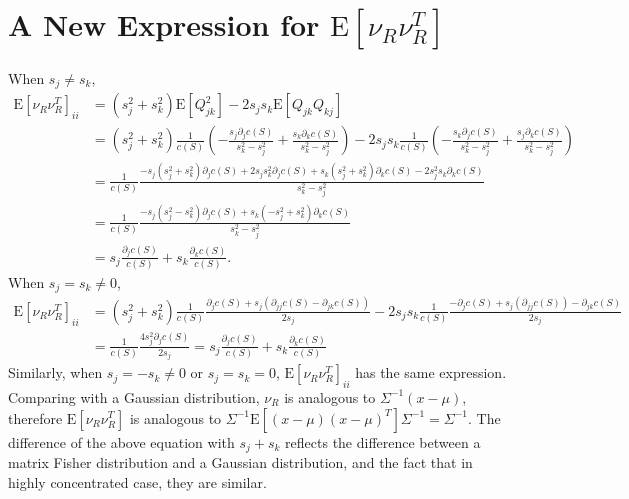 \documentclass[10pt]{article}
\title{\vspace{-4ex}\textbf{}}
\date{}
\newcommand{\expect}[1]{\ensuremath{\mathrm{E}\left[ #1 \right]}}
\begin{document}
\section{A New Expression for $\expect{\nu_R\nu_R^T}$}

When $s_j \neq s_k$,
\begin{align*}
	\expect{\nu_R\nu_R^T}_{ii} &= (s_j^2+s_k^2)\expect{Q_{jk}^2} - 2s_js_k\expect{Q_{jk}Q_{kj}} \\
	&= (s_j^2+s_k^2) \frac{1}{c(S)} \left( -\frac{s_j\partial_jc(S)}{s_k^2-s_j^2} + \frac{s_k\partial_kc(S)}{s_k^2-s_j^2} \right) - 2s_js_k \frac{1}{c(S)} \left( -\frac{s_k\partial_jc(S)}{s_k^2-s_j^2} + \frac{s_j\partial_kc(S)}{s_k^2-s_j^2} \right) \\
	&= \frac{1}{c(S)} \frac{ -s_j(s_j^2+s_k^2)\partial_jc(S) + 2s_js_k^2\partial_jc(S) + s_k(s_j^2+s_k^2)\partial_kc(S) - 2s_j^2s_k\partial_kc(S) }{s_k^2-s_j^2} \\
	&= \frac{1}{c(S)} \frac{ -s_j(s_j^2-s_k^2)\partial_jc(S) + s_k(-s_j^2+s_k^2)\partial_kc(S) }{s_k^2-s_j^2} \\
	&= s_j\frac{\partial_jc(S)}{c(S)} + s_k\frac{\partial_kc(S)}{c(S)}.
\end{align*}
When $s_j=s_k \neq 0$,
\begin{align*}
	\expect{\nu_R\nu_R^T}_{ii} &= (s_j^2+s_k^2) \frac{1}{c(S)} \frac{ \partial_jc(S) + s_j(\partial_{jj}c(S)-\partial_{jk}c(S)) }{2s_j} - 2s_js_k \frac{1}{c(S)} \frac{ -\partial_jc(S) + s_j(\partial_{jj}c(S)) - \partial_{jk}c(S) }{2s_j} \\
	&= \frac{1}{c(S)} \frac{4s_j^2\partial_jc(S)}{2s_j} = s_j\frac{\partial_jc(S)}{c(S)} + s_k\frac{\partial_kc(S)}{c(S)}
\end{align*}
Similarly, when $s_j=-s_k \neq 0$ or $s_j=s_k=0$, $\expect{\nu_R\nu_R^T}_{ii}$ has the same expression.
Comparing with a Gaussian distribution, $\nu_R$ is analogous to $\Sigma^{-1}(x-\mu)$, therefore $\expect{\nu_R\nu_R^T}$ is analogous to $\Sigma^{-1}\expect{(x-\mu)(x-\mu)^T}\Sigma^{-1} = \Sigma^{-1}$.
The difference of the above equation with $s_j+s_k$ reflects the difference between a matrix Fisher distribution and a Gaussian distribution, and the fact that in highly concentrated case, they are similar.
\end{document}
